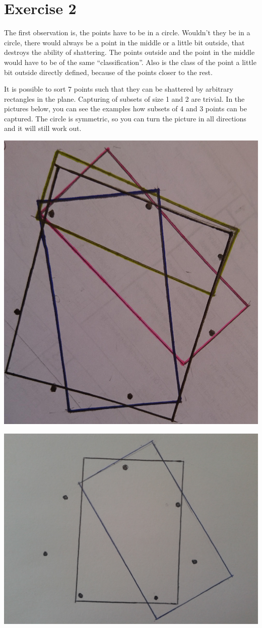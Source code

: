 \documentclass{article}
\begin{document}
\section*{Exercise 2}
The first observation is, the points have to be in a circle. Wouldn't they be in
a circle, there would always be a point in the middle or a little bit outside, that destroys the ability of shattering. The points outside and the point in the middle would have to be of
the same ``classification''. Also is the class of the point a little bit outside directly defined, because of the points closer to the rest.

It is possible to sort 7 points such that they can be shattered by arbitrary rectangles in the plane. Capturing of subsets of size 1
and 2 are trivial. In the pictures below, you can see the examples how subsets of 4 and 3 points can be captured. The circle
is symmetric, so you can turn the picture in all directions and it will still work out.

\includegraphics[width=.6\linewidth]{2.jpg}

\includegraphics[width=.6\linewidth]{23.jpg}
\end{document}
